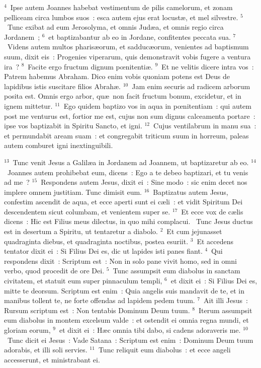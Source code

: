 ${}^{4}$~Ipse autem Joannes habebat vestimentum de pilis camelorum, et zonam pelliceam circa lumbos suos~: esca autem ejus erat locust\ae , et mel silvestre.
${}^{5}$~Tunc exibat ad eum Jerosolyma, et omnis Jud\ae a, et omnis regio circa Jordanem~;
${}^{6}$~et baptizabantur ab eo in Jordane, confitentes peccata sua.
${}^{7}$~Videns autem multos pharis\ae orum, et sadduc\ae orum, venientes ad baptismum suum, dixit eis~: Progenies viperarum, quis demonstravit vobis fugere a ventura ira~?
${}^{8}$~Facite ergo fructum dignum pœnitenti\ae .
${}^{9}$~Et ne velitis dicere intra vos~: Patrem habemus Abraham. Dico enim vobis quoniam potens est Deus de lapidibus istis suscitare filios Abrah\ae .
${}^{10}$~Jam enim securis ad radicem arborum posita est. Omnis ergo arbor, qu\ae\ non facit fructum bonum, excidetur, et in ignem mittetur.
${}^{11}$~Ego quidem baptizo vos in aqua in pœnitentiam~: qui autem post me venturus est, fortior me est, cujus non sum dignus calceamenta portare~: ipse vos baptizabit in Spiritu Sancto, et igni.
${}^{12}$~Cujus ventilabrum in manu sua~: et permundabit aream suam~: et congregabit triticum suum in horreum, paleas autem comburet igni inextinguibili.


${}^{13}$~Tunc venit Jesus a Galil\ae a in Jordanem ad Joannem, ut baptizaretur ab eo.
${}^{14}$~Joannes autem prohibebat eum, dicens~: Ego a te debeo baptizari, et tu venis ad me~?
${}^{15}$~Respondens autem Jesus, dixit ei~: Sine modo~: sic enim decet nos implere omnem justitiam. Tunc dimisit eum.
${}^{16}$~Baptizatus autem Jesus, confestim ascendit de aqua, et ecce aperti sunt ei c\ae li~: et vidit Spiritum Dei descendentem sicut columbam, et venientem super se.
${}^{17}$~Et ecce vox de c\ae lis dicens~: Hic est Filius meus dilectus, in quo mihi complacui.
~Tunc Jesus ductus est in desertum a Spiritu, ut tentaretur a diabolo.
${}^{2}$~Et cum jejunasset quadraginta diebus, et quadraginta noctibus, postea esuriit.
${}^{3}$~Et accedens tentator dixit ei~: Si Filius Dei es, dic ut lapides isti panes fiant.
${}^{4}$~Qui respondens dixit~: Scriptum est~: Non in solo pane vivit homo, sed in omni verbo, quod procedit de ore Dei.
${}^{5}$~Tunc assumpsit eum diabolus in sanctam civitatem, et statuit eum super pinnaculum templi,
${}^{6}$~et dixit ei~: Si Filius Dei es, mitte te deorsum. Scriptum est enim~: Quia angelis suis mandavit de te, et in manibus tollent te, ne forte offendas ad lapidem pedem tuum.
${}^{7}$~Ait illi Jesus~: Rursum scriptum est~: Non tentabis Dominum Deum tuum.
${}^{8}$~Iterum assumpsit eum diabolus in montem excelsum valde~: et ostendit ei omnia regna mundi, et gloriam eorum,
${}^{9}$~et dixit ei~: H\ae c omnia tibi dabo, si cadens adoraveris me.
${}^{10}$~Tunc dicit ei Jesus~: Vade Satana~: Scriptum est enim~: Dominum Deum tuum adorabis, et illi soli servies.
${}^{11}$~Tunc reliquit eum diabolus~: et ecce angeli accesserunt, et ministrabant ei.


